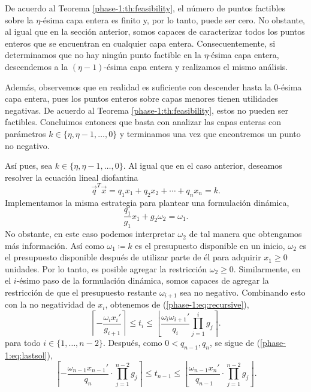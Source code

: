 
De acuerdo al Teorema \ref{phase-1:th:feasibility}, el número de puntos factibles sobre la
$\eta$-ésima capa entera es finito y, por lo tanto, puede ser cero. No obstante, al igual que en la
sección anterior, somos capaces de caracterizar todos los puntos enteros que se encuentran en
cualquier capa entera. Consecuentemente, si determinamos que no hay ningún punto factible en la
$\eta$-ésima capa entera, descendemos a la $(\eta -1)$-ésima capa entera y realizamos el mismo
análisis.

Además, observemos que en realidad es suficiente con descender hasta la 0-ésima capa entera, pues
los puntos enteros sobre capas menores tienen utilidades negativas. De acuerdo al Teorema
\ref{phase-1:th:feasibility}, estos no pueden ser factibles. Concluimos entonces que basta con
analizar las capas enteras con parámetros $k \in \lbrace \eta, \eta - 1, \ldots, 0 \rbrace$ y
terminamos una vez que encontremos un punto no negativo.

Así pues, sea $k \in \lbrace \eta, \eta - 1, \ldots, 0 \rbrace$. Al igual que en el caso anterior,
deseamos resolver la ecuación lineal diofantina
\begin{equation*}
	\vec{q}^T\vec{x} = q_1x_1 + q_2x_2 + \cdots + q_nx_n = k.
\end{equation*}
Implementamos la misma estrategia para plantear una formulación dinámica,
\begin{equation*}
	\frac{q_1}{g_1}x_1 + g_2\omega_2 = \omega_1.
\end{equation*}
No obstante, en este caso podemos interpretar $\omega_2$ de tal manera que obtengamos más
información. Así como $\omega_1 \coloneq k$  es el presupuesto disponible en un inicio, $\omega_2$
es el presupuesto disponible después de utilizar parte de él para adquirir $x_1 \geq 0$ unidades.
Por lo tanto, es posible agregar la restricción $\omega_2 \geq 0$. Similarmente, en el $i$-ésimo
paso de la formulación dinámica, somos capaces de agregar la restricción de que el presupuesto
restante $\omega_{i + 1}$ sea no negativo. Combinando esto con la no negatividad de $x_i$, obtenemos
de (\ref{phase-1:eq:recursive}),
\begin{equation}
	\label{phase-1:finite:eq:param-bounds}
	\left\lceil -\frac{\omega_ix_i'}{g_{i+1}} \right\rceil
	\leq
	t_i
	\leq
	\left\lfloor \frac{\omega_i\omega_{i+1}'}{q_i} \prod_{j=1}^{i}g_j \right\rceil.
\end{equation}
para todo $i \in \lbrace 1, \ldots, n - 2\rbrace$. Después, como $0 < q_{n - 1}, q_n$, se sigue de
(\ref{phase-1:eq:lastsol}),
\begin{equation}
	\label{phase-1:finite:eq:param-bounds-last}
	\left\lceil -\frac{\omega_{n-1}x_{n-1}'}{q_n} \cdot \prod_{j=1}^{n-2}g_j \right\rceil
	\leq
	t_{n - 1}
	\leq
	\left\lfloor \frac{\omega_{n-1}x_{n}'}{q_{n-1}} \cdot \prod_{j=1}^{n-2}g_j \right\rfloor.
\end{equation}

